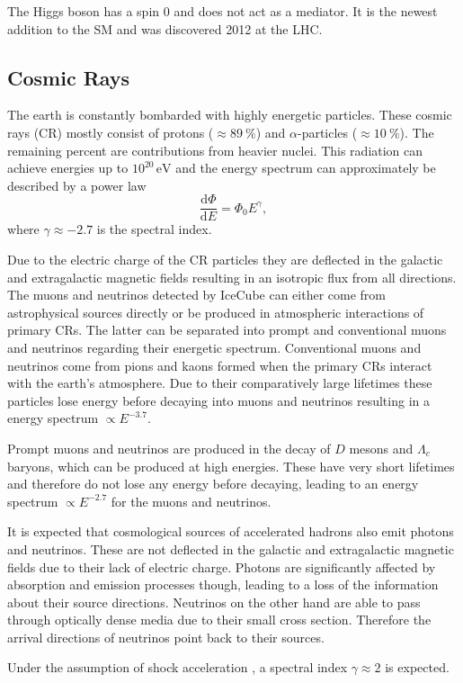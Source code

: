 The Higgs boson has a spin $0$ and does not act as a mediator. It is the newest addition to the SM and was discovered 2012 at the LHC\cite{ATLAS:2012yve}.

\subsection{Cosmic Rays}
The earth is constantly bombarded with highly energetic particles. These cosmic rays (CR) mostly consist of protons ($\approx \SI{89}{\percent}$) and $\alpha$-particles ($\approx \SI{10}{\percent}$). The remaining percent are contributions from heavier nuclei. This radiation can achieve energies up to $10^{20}\,\si{\electronvolt}$ and the energy spectrum can approximately be described by a power law
\begin{equation}
  \frac{\mathrm{d}\Phi}{\mathrm{d}E} = \Phi_0 E^{\gamma},
\end{equation}
where $\gamma \approx - 2.7$ is the spectral index.

Due to the electric charge of the CR particles they are deflected in the galactic and extragalactic magnetic fields resulting in an isotropic flux from all directions.\\

The muons and neutrinos detected by IceCube can either come from astrophysical sources directly or be produced in atmospheric interactions of primary CRs. The latter can be separated into prompt and conventional muons and neutrinos regarding their energetic spectrum. Conventional muons and neutrinos come from pions and kaons formed when the primary CRs interact with the earth's atmosphere. Due to their comparatively large lifetimes these particles lose energy before decaying into muons and neutrinos resulting in a energy spectrum $\propto E^{-3.7}$.

Prompt muons and neutrinos are produced in the decay of $D$ mesons and $\Lambda_c$ baryons, which can be produced at high energies. These have very short lifetimes and therefore do not lose any energy before decaying, leading to an energy spectrum $\propto E^{-2.7}$ for the muons and neutrinos.

It is expected that cosmological sources of accelerated hadrons also emit photons and neutrinos. These are not deflected in the galactic and extragalactic magnetic fields due to their lack of electric charge. Photons are significantly affected by absorption and emission processes though, leading to a loss of the information about their source directions. Neutrinos on the other hand are able to pass through optically dense media due to their small cross section. Therefore the arrival directions of neutrinos point back to their sources.

Under the assumption of shock acceleration \cite{Fermi}, a spectral index $\gamma \approx 2$ is expected.
